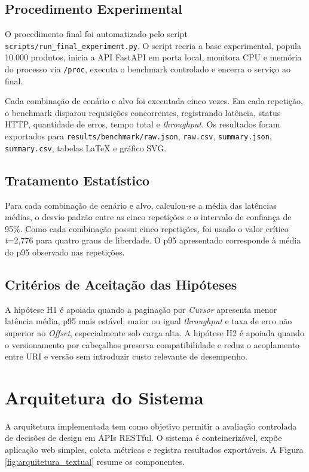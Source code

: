 \documentclass[journal]{IEEEtran}
\begin{document}
\subsection{Procedimento Experimental}

O procedimento final foi automatizado pelo script \texttt{scripts/run\_final\_experiment.py}. O script recria a base experimental, popula 10.000 produtos, inicia a API FastAPI em porta local, monitora CPU e memória do processo via \texttt{/proc}, executa o benchmark controlado e encerra o serviço ao final.

Cada combinação de cenário e alvo foi executada cinco vezes. Em cada repetição, o benchmark disparou requisições concorrentes, registrando latência, status HTTP, quantidade de erros, tempo total e \textit{throughput}. Os resultados foram exportados para \texttt{results/benchmark/raw.json}, \texttt{raw.csv}, \texttt{summary.json}, \texttt{summary.csv}, tabelas LaTeX e gráfico SVG.

\subsection{Tratamento Estatístico}

Para cada combinação de cenário e alvo, calculou-se a média das latências médias, o desvio padrão entre as cinco repetições e o intervalo de confiança de 95\%. Como cada combinação possui cinco repetições, foi usado o valor crítico \textit{t}=2,776 para quatro graus de liberdade. O p95 apresentado corresponde à média do p95 observado nas repetições.

\subsection{Critérios de Aceitação das Hipóteses}

A hipótese H1 é apoiada quando a paginação por \textit{Cursor} apresenta menor latência média, p95 mais estável, maior ou igual \textit{throughput} e taxa de erro não superior ao \textit{Offset}, especialmente sob carga alta. A hipótese H2 é apoiada quando o versionamento por cabeçalhos preserva compatibilidade e reduz o acoplamento entre URI e versão sem introduzir custo relevante de desempenho.


\section{Arquitetura do Sistema}

A arquitetura implementada tem como objetivo permitir a avaliação controlada de decisões de design em APIs RESTful. O sistema é conteinerizável, expõe aplicação web simples, coleta métricas e registra resultados exportáveis. A Figura \ref{fig:arquitetura_textual} resume os componentes.
\end{document}
